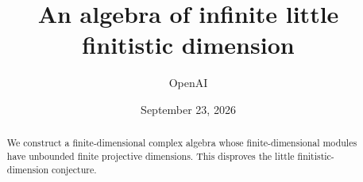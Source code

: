 \documentclass[11pt]{article}
\title{An algebra of infinite little finitistic dimension}
\author{OpenAI}
\date{September 23, 2026}
\begin{document}
\maketitle
\begin{abstract}
We construct a finite-dimensional complex algebra whose finite-dimensional
modules have unbounded finite projective dimensions. This disproves the little
finitistic-dimension conjecture.
\end{abstract}








\end{document}
